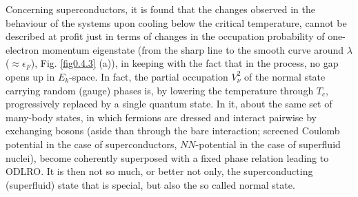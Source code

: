  Concerning superconductors, it is found that the changes observed in the behaviour of the systems upon cooling below the critical temperature, cannot be described at profit just in terms of changes in the occupation probability of one-electron momentum eigenstate (from the sharp line to the smooth curve around $\lambda$ ($\approx\epsilon_F$), Fig. \ref{fig0.4.3} (a)), in keeping with the fact that in the process, no gap opens up in $E_k$-space. In fact, the partial occupation $V^2_\nu$ of the normal state carrying random (gauge) phases is, by lowering the temperature through $T_c$, progressively replaced by a single quantum state. In it, about the same set of many-body states, in which fermions are dressed and interact pairwise by exchanging  bosons (aside than through the bare interaction; screened Coulomb potential in the case of superconductors, $NN$-potential in the case of superfluid nuclei), become coherently superposed with a fixed phase relation leading to ODLRO. It is then not so much, or better not only, the superconducting (superfluid) state that is special, but also the so called normal state.
 
